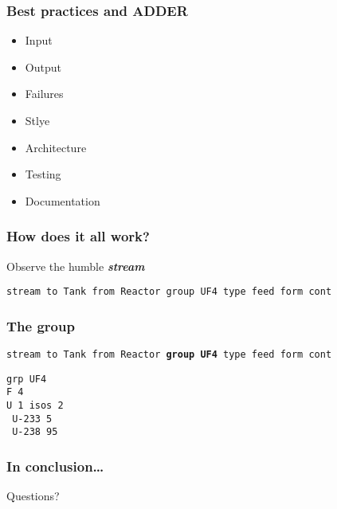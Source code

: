 \documentclass{beamer}
\begin{document}
\begin{frame}
\frametitle{Best practices and ADDER}

    \begin{itemize}
        \item Input
        \item Output
        \item Failures
        \item Stlye
        \item Architecture
        \item Testing
        \item Documentation
    \end{itemize}

\end{frame}

\begin{frame}
\frametitle{How does it all work?}

Observe the humble \textbf{\textit{stream}}

\hspace{2cm}

\small{\texttt{stream to Tank from Reactor group UF4 type feed form cont}}

\end{frame}

\begin{frame}
\frametitle{The group}

\small{\texttt{stream to Tank from Reactor \textbf{group UF4} type feed form cont}}

\hspace{3cm}

\texttt{grp UF4}\\
\texttt{F   4}\\
\texttt{U   1   isos    2}\\
\texttt{    U-233    5}\\
\texttt{    U-238   95}

\end{frame}

















\begin{frame}
\frametitle{In conclusion\ldots}

    Questions?

\end{frame}
\end{document}
